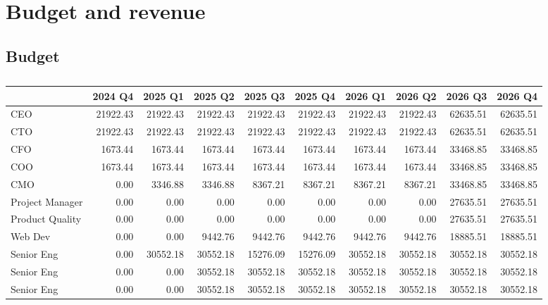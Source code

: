 \section{Budget and revenue} \label{sec:sed-ultrices}

\subsection{Budget}

\begin{table}[h]
\caption{}
\footnotesize
\begin{tabular}{lrrrrrrrrr} 
\toprule
 &2024 Q4  &2025 Q1 &2025 Q2 &2025 Q3 &2025 Q4 &2026 Q1 &2026 Q2&2026 Q3 &2026 Q4 \\ \hline
CEO                              & 21922.43 & 21922.43 & 21922.43 & 21922.43 & 21922.43 & 21922.43 & 21922.43 & 62635.51 & 62635.51\\
CTO                              & 21922.43 & 21922.43 & 21922.43 & 21922.43 & 21922.43 & 21922.43 & 21922.43 & 62635.51 & 62635.51\\
CFO                              & 1673.44  & 1673.44  & 1673.44  & 1673.44  & 1673.44  & 1673.44  & 1673.44  & 33468.85 & 33468.85\\
COO                              & 1673.44  & 1673.44  & 1673.44  & 1673.44  & 1673.44  & 1673.44  & 1673.44  & 33468.85 & 33468.85\\
CMO                              & 0.00     & 3346.88  & 3346.88  & 8367.21  & 8367.21  & 8367.21  & 8367.21  & 33468.85 & 33468.85\\
Project Manager     & 0.00     & 0.00     & 0.00     & 0.00     & 0.00     & 0.00     & 0.00     & 27635.51 & 27635.51\\
Product Quality      & 0.00     & 0.00     & 0.00     & 0.00     & 0.00     & 0.00     & 0.00     & 27635.51 & 27635.51\\
Web Dev                 & 0.00     & 0.00     & 9442.76  & 9442.76  & 9442.76  & 9442.76  & 9442.76  & 18885.51 & 18885.51\\
Senior Eng                       & 0.00     & 30552.18 & 30552.18 & 15276.09 & 15276.09 & 30552.18 & 30552.18 & 30552.18 & 30552.18\\
Senior Eng                       & 0.00     & 0.00     & 30552.18 & 30552.18 & 30552.18 & 30552.18 & 30552.18 & 30552.18 & 30552.18\\
Senior Eng                       & 0.00     & 0.00     & 30552.18 & 30552.18 & 30552.18 & 30552.18 & 30552.18 & 30552.18 & 30552.18\\

\end{tabular}
\end{table}
